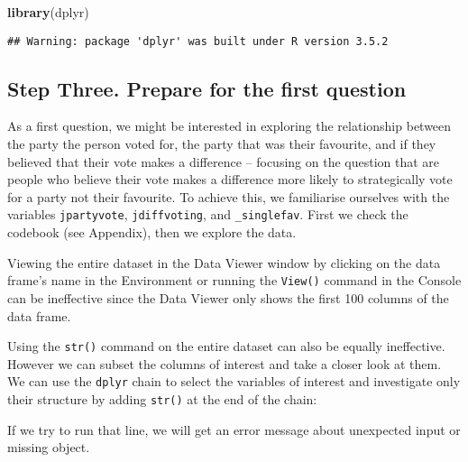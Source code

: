 \documentclass[]{article}
\newenvironment{Shaded}{\begin{snugshade}}{\end{snugshade}}
\newcommand{\KeywordTok}[1]{\textcolor[rgb]{0.13,0.29,0.53}{\textbf{#1}}}
\newcommand{\StringTok}[1]{\textcolor[rgb]{0.31,0.60,0.02}{#1}}
\newcommand{\OperatorTok}[1]{\textcolor[rgb]{0.81,0.36,0.00}{\textbf{#1}}}
\newcommand{\NormalTok}[1]{#1}
\begin{document}
\begin{Shaded}
\begin{Highlighting}[]
\KeywordTok{library}\NormalTok{(dplyr)}
\end{Highlighting}
\end{Shaded}

\begin{verbatim}
## Warning: package 'dplyr' was built under R version 3.5.2
\end{verbatim}

\subsection{Step Three. Prepare for the first
question}\label{step-three.-prepare-for-the-first-question}

As a first question, we might be interested in exploring the
relationship between the party the person voted for, the party that was
their favourite, and if they believed that their vote makes a difference
-- focusing on the question that are people who believe their vote makes
a difference more likely to strategically vote for a party not their
favourite. To achieve this, we familiarise ourselves with the variables
\texttt{jpartyvote}, \texttt{jdiffvoting}, and \texttt{\_singlefav}.
First we check the codebook (see Appendix), then we explore the data.

Viewing the entire dataset in the Data Viewer window by clicking on the
data frame's name in the Environment or running the \texttt{View()}
command in the Console can be ineffective since the Data Viewer only
shows the first 100 columns of the data frame.

Using the \texttt{str()} command on the entire dataset can also be
equally ineffective. However we can subset the columns of interest and
take a closer look at them. We can use the \texttt{dplyr} chain to
select the variables of interest and investigate only their structure by
adding \texttt{str()} at the end of the chain:

\begin{Shaded}
\end{Shaded}

If we try to run that line, we will get an error message about
unexpected input or missing object.
\end{document}
